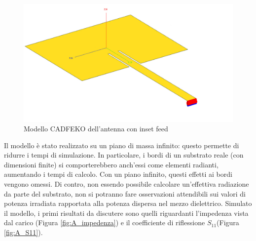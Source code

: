 \documentclass[twoside,twocolumn]{article}
\begin{document}
\begin{figure}[h!]
  \includegraphics[width=\linewidth]{A_Cad.jpg}
  \caption{Modello CADFEKO dell'antenna con inset feed}
  \label{fig:A_Cad}
\end{figure}
Il modello è stato realizzato su un piano di massa infinito: questo permette di ridurre i tempi di simulazione. In particolare, i bordi di un substrato reale (con dimensioni finite) si comporterebbero anch'essi come elementi radianti, aumentando i tempi  di calcolo.
Con un piano infinito, questi effetti ai bordi vengono omessi. Di contro, non essendo possibile calcolare un'effettiva radiazione da parte del substrato, non si potranno fare osservazioni attendibili sui valori di potenza irradiata rapportata alla potenza dispersa nel mezzo dielettrico.\newline \newline
Simulato il modello, i primi risultati da discutere sono quelli riguardanti l'impedenza vista dal carico (Figura \ref{fig:A_impedenza}) e il coefficiente di riflessione $S_{11}$(Figura  \ref{fig:A_S11}).
\end{document}
